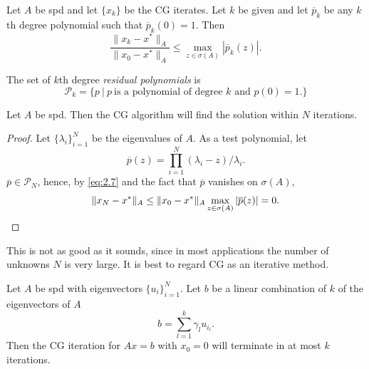 \begin{coro}
  Let $A$ be spd and let $\{x_k\}$ be the CG iterates. Let $k$ be
given and let $\overline{p}_k$ be any $k$th degree polynomial such
that $\overline{p}_k(0)=1.$ Then
\begin{equation}
  \label{eq:2.7}
  \frac{\|x_k-x^*\|_A}{\|x_0-x^*\|_A}\leq\max_{z\in\sigma(A)}|\overline{p}_k(z)|.
\end{equation}
\end{coro}

\begin{defi}
  The set of $k$th degree \emph{residual polynomials} is
  \begin{equation}
    \label{eq:2.8}
    \mathcal{P}_k=\{p\ |\  p\ \text{is a polynomial of degree $k$ and
    } p(0)=1.\}
  \end{equation}
\end{defi}

\begin{thm}
  Let $A$ be spd. Then the CG algorithm will find the solution within
  $N$ iterations.
\end{thm}

\begin{proof}
  Let $\{\lambda_i\}_{i=1}^N$ be the eigenvalues of $A$. As a test
  polynomial, let $$\overline{p}(z)=\prod\limits_{i=1}^N(\lambda_i-z)/\lambda_i.$$
  $\overline{p}\in\mathcal{P}_N$, hence, by \eqref{eq:2.7} and the
  fact that $\overline{p}$ vanishes on $\sigma(A)$,
  \begin{equation*}
    \|x_N-x^*\|_A\leq\|x_0-x^*\|_A\max_{z\in\sigma(A)}|\overline{p}(z)|=0.\qedhere
  \end{equation*}
\end{proof}

\begin{rmk}
  This is not as good as it sounds, since in most applications the
  number of unknowns $N$ is very large. It is best to regard CG as an
  iterative method.
\end{rmk}

\begin{thm}
  Let $A$ be spd with eigenvectors $\{u_i\}_{i=1}^N.$ Let $b$ be a
  linear combination of $k$ of the eigenvectors of
  $A$ $$b=\sum\limits_{l=1}^k\gamma_lu_{i_l}.$$
  Then the CG iteration for $Ax=b$ with $x_0=0$ will terminate in at
  most $k$ iterations.
\end{thm}


